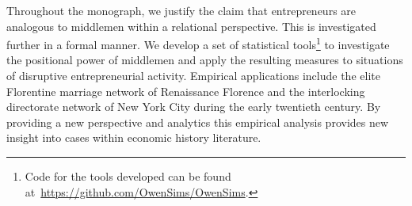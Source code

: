 \documentclass[11pt,fleqn]{book}
\begin{document}
\begin{singlespace}
Throughout the monograph, we justify the claim that entrepreneurs are analogous to middlemen within a relational perspective. This is investigated further in a formal manner. We develop a set of statistical tools\footnote{Code for the tools developed can be found at~\href{https://github.com/OwenSims/OwenSims}{https://github.com/OwenSims/OwenSims}.} to investigate the positional power of middlemen and apply the resulting measures to situations of disruptive entrepreneurial activity. Empirical applications include the elite Florentine marriage network of Renaissance Florence and the interlocking directorate network of New York City during the early twentieth century. By providing a new perspective and analytics this empirical analysis provides new insight into cases within economic history literature.

\end{singlespace}

\newpage
\mbox{}
\thispagestyle{empty}
\newpage













\singlespace





\end{document}

